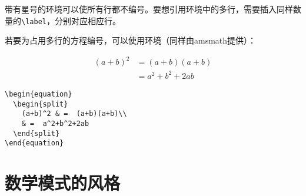 \begin{ii}
带有星号的环境可以使所有行都不编号。要想引用环境中的多行，需要插入同样数量的\verb|\label|，分别对应相应行。
\end{ii}

若要为占用多行的方程编号，可以使用环境（同样由\textsf{amsmath}提供）：

\begin{codelist}[3.23]{
  \begin{equation}
    \begin{split}
      (a+b)^2 & =  (a+b)(a+b)\\
      & =  a^2+b^2+2ab
    \end{split}
  \end{equation}
}\begin{verbatim}
\begin{equation}
  \begin{split}
    (a+b)^2 & =  (a+b)(a+b)\\
    & =  a^2+b^2+2ab
  \end{split}
\end{equation}
\end{verbatim}
\end{codelist}

\section{数学模式的风格}

